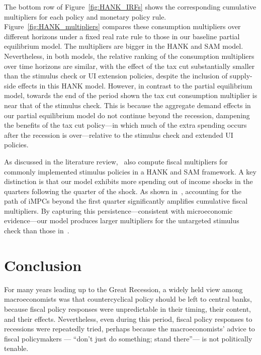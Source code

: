 \documentclass[qe]{econsocart}
\begin{document}
\vspace{0.5em}

The bottom row of Figure~\ref{fig:HANK_IRFs} shows the corresponding cumulative multipliers for each policy and monetary policy rule. Figure~\ref{fig:HANK_multipliers} compares these consumption multipliers over different horizons under a fixed real rate rule to those in our baseline partial equilibrium model.
The multipliers are bigger in the HANK and SAM model.
Nevertheless, in both models, the relative ranking of the consumption multipliers over time horizons are similar, with the effect of the tax cut substantially smaller than the stimulus check or UI extension policies, despite the inclusion of supply-side effects in this HANK model.
However, in contrast to the partial equilibrium model, towards the end of the period shown the tax cut consumption multiplier is near that of the stimulus check.
This is because the aggregate demand effects in our partial equilibrium model do not continue beyond the recession, dampening the benefits of the tax cut policy---in which much of the extra spending occurs after the recession is over---relative to the stimulus check and extended UI policies.

As discussed in the literature review,~\cite{broer2025stimulus} also compute fiscal multipliers for commonly implemented stimulus policies in a HANK and SAM framework. A key distinction is that our model exhibits more spending out of income shocks in the quarters following the quarter of the shock. As shown in~\cite{auclert2018IKC}, accounting for the path of iMPCs beyond the first quarter significantly amplifies cumulative fiscal multipliers. By capturing this persistence—consistent with microeconomic evidence—our model produces larger multipliers for the untargeted stimulus check than those in~\cite{broer2025stimulus}.

\section{Conclusion}\label{conclusion}
\label{sec:conclusion} 

For many years leading up to the Great Recession, a widely held view among macroeconomists was that countercyclical policy should be left to central banks, because fiscal policy responses were unpredictable in their timing, their content, and their effects.  Nevertheless, even during this period, fiscal policy responses to recessions were repeatedly tried, perhaps because the macroeconomists' advice to fiscal policymakers --- ``don't just do something; stand there''--- is not politically tenable.
\end{document}

